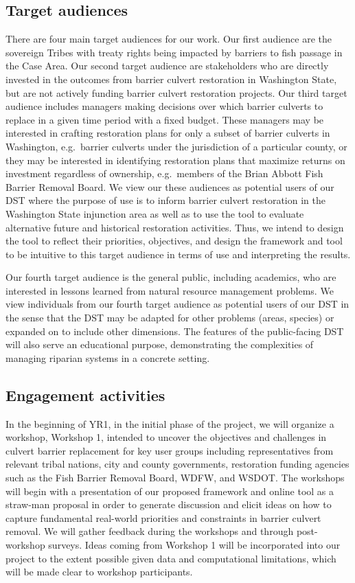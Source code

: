 \documentclass[12pt]{elsarticle}
\begin{document}
\subsection*{Target audiences}

There are four main target audiences for our work. Our first audience are the sovereign Tribes with treaty rights being impacted by barriers to fish passage in the Case Area. Our second target audience are stakeholders who are directly invested in the outcomes from barrier culvert restoration in Washington State, but are not actively funding barrier culvert restoration projects. Our third target audience includes managers making decisions over which barrier culverts to replace in a given time period with a fixed budget. These managers may be interested in crafting restoration plans for only a subset of barrier culverts in Washington, e.g.\ barrier culverts under the jurisdiction of a particular county, or they may be interested in identifying restoration plans that maximize returns on investment regardless of ownership, e.g.\ members of the Brian Abbott Fish Barrier Removal Board. We view our these audiences as potential users of our DST where the purpose of use is to inform barrier culvert restoration in the Washington State injunction area as well as to use the tool to evaluate alternative future and historical restoration activities. Thus, we intend to design the tool to reflect their priorities, objectives, and design the framework and tool to be intuitive to this target audience in terms of use and interpreting the results.

Our fourth target audience is the general public, including academics, who are interested in lessons learned from natural resource management problems. We view individuals from our fourth target audience as potential users of our DST in the sense that the DST may be adapted for other problems (areas, species) or expanded on to include other dimensions. The features of the public-facing DST will also serve an educational purpose, demonstrating the complexities of managing riparian systems in a concrete setting. 

\subsection*{Engagement activities}

In the beginning of YR1, in the initial phase of the project, we will organize a workshop, Workshop 1, intended to uncover the objectives and challenges in culvert barrier replacement for key user groups including representatives from relevant tribal nations, city and county governments, restoration funding agencies such as the Fish Barrier Removal Board, WDFW, and WSDOT. The workshops will begin with a presentation of our proposed framework and online tool as a straw-man proposal in order to generate discussion and elicit ideas on how to capture fundamental real-world priorities and constraints in barrier culvert removal. We will gather feedback during the workshops and through post-workshop surveys. Ideas coming from Workshop 1 will be incorporated into our project to the extent possible given data and computational limitations, which will be made clear to workshop participants.
\end{document}
